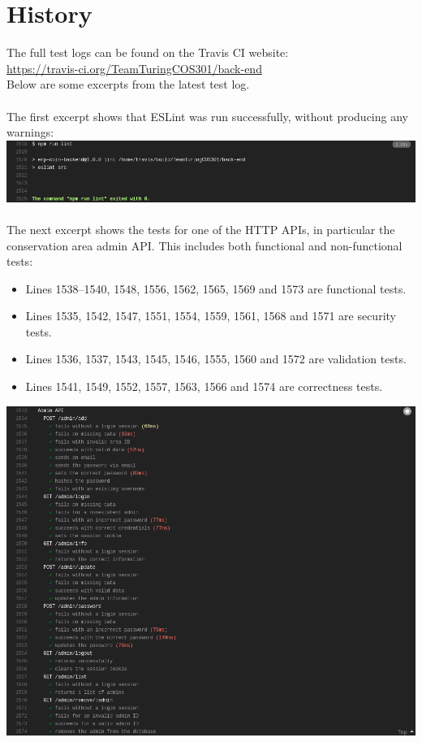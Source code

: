 \documentclass{article}
\begin{document}
\section{History}
The full test logs can be found on the Travis CI website:\\
\url{https://travis-ci.org/TeamTuringCOS301/back-end}\\
Below are some excerpts from the latest test log.
\\\\
The first excerpt shows that ESLint was run successfully, without producing any warnings:\\
\includegraphics[scale=0.43]{eslint-log.png}
\\\\
The next excerpt shows the tests for one of the HTTP APIs, in particular the conservation area admin API. This includes both functional and non-functional tests:
\begin{itemize}
\item Lines 1538--1540, 1548, 1556, 1562, 1565, 1569 and 1573 are functional tests.
\item Lines 1535, 1542, 1547, 1551, 1554, 1559, 1561, 1568 and 1571 are security tests.
\item Lines 1536, 1537, 1543, 1545, 1546, 1555, 1560 and 1572 are validation tests.
\item Lines 1541, 1549, 1552, 1557, 1563, 1566 and 1574 are correctness tests.
\end{itemize}
\includegraphics[scale=0.43]{admin-api-log.png}
\end{document}
